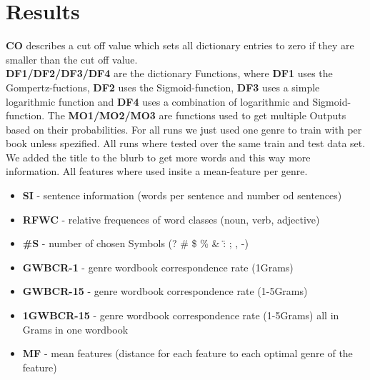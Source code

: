 \documentclass{article}
\begin{document}
\section{Results}

\textbf{CO} describes a cut off value which sets all dictionary entries to zero if they are smaller than the cut off value.\\
\textbf{DF1/DF2/DF3/DF4} are the dictionary Functions, where \textbf{DF1} uses the Gompertz-fuctions, \textbf{DF2} uses the Sigmoid-function, \textbf{DF3} uses a simple logarithmic function and \textbf{DF4} uses a combination of logarithmic and Sigmoid-function.
The \textbf{MO1/MO2/MO3} are functions used to get multiple Outputs based on their probabilities.
For all runs we just used one genre to train with per book unless spezified. All runs where tested over the same train and test data set. We added the title to the blurb to get more words and this way more information. All features where used insite a mean-feature per genre.\\

\begin{itemize}
    \item \textbf{SI} - sentence information (words per sentence and number od sentences)
    \item \textbf{RFWC} - relative frequences of word classes (noun, verb, adjective)
    \item \textbf{\#S} - number of chosen Symbols (? \# \$ \% \& \" : ; , -)
    \item \textbf{GWBCR-1} - genre wordbook correspondence rate (1Grams)
    \item \textbf{GWBCR-15} - genre wordbook correspondence rate (1-5Grams)
    \item \textbf{1GWBCR-15} - genre wordbook correspondence rate (1-5Grams) all in Grams in one wordbook
    \item \textbf{MF} - mean features (distance for each feature to each optimal genre of the feature)
\end{itemize}
\end{document}
